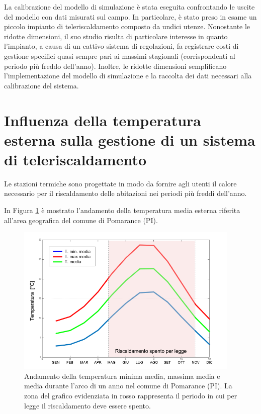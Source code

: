 \documentclass[laurea,oneside,11pt]{USiena_tesiLM3}
\begin{document}
La calibrazione del modello di simulazione è stata eseguita confrontando le uscite del modello con dati misurati sul campo.
In particolare, è stato preso in esame un piccolo impianto di teleriscaldamento composto da undici utenze. Nonostante le ridotte dimensioni, il suo studio risulta di particolare interesse in quanto l'impianto, a causa di un cattivo sistema di regolazioni, fa registrare costi di gestione specifici quasi sempre pari ai massimi stagionali (corrispondenti al periodo più freddo dell'anno). Inoltre, le ridotte dimensioni  semplificano l'implementazione del modello di simulazione e la raccolta dei dati necessari alla calibrazione del sistema.  

\section{Influenza della temperatura esterna sulla gestione di un sistema di teleriscaldamento}
Le stazioni termiche sono progettate in modo da fornire agli utenti il calore necessario per il riscaldamento delle abitazioni nei periodi più freddi dell'anno.

In Figura \ref{fig:profilo_temp} è mostrato l'andamento della temperatura media esterna riferita all'area geografica del comune di Pomarance (PI).

\begin{figure}[!ht]
\centering
\includegraphics[width=0.95\textwidth]{figure/profilo_temp} 
\caption{Andamento della temperatura minima media, massima media e media durante l'arco di un anno nel comune di Pomarance (PI). La zona del grafico evidenziata in rosso rappresenta il periodo in cui per legge il riscaldamento deve essere spento. }
\label{fig:profilo_temp}
\end{figure}
\end{document}
